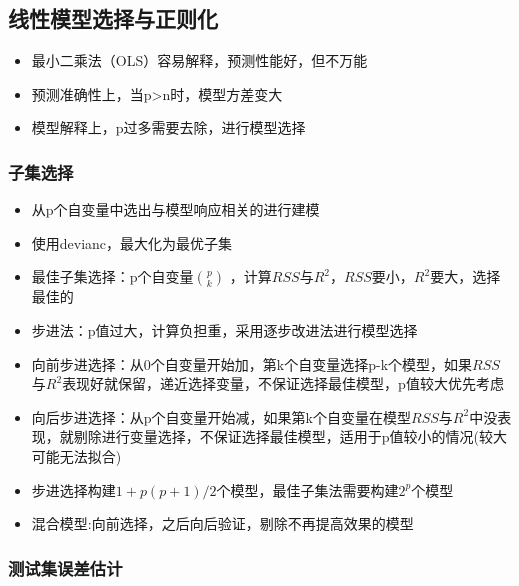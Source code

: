 \documentclass[
]{book}
\providecommand{\tightlist}{%
  \setlength{\itemsep}{0pt}\setlength{\parskip}{0pt}}
\begin{document}
\hypertarget{ux7ebfux6027ux6a21ux578bux9009ux62e9ux4e0eux6b63ux5219ux5316}{%
\subsection{线性模型选择与正则化}\label{ux7ebfux6027ux6a21ux578bux9009ux62e9ux4e0eux6b63ux5219ux5316}}

\begin{itemize}
\tightlist
\item
  最小二乘法（OLS）容易解释，预测性能好，但不万能
\item
  预测准确性上，当p\textgreater n时，模型方差变大
\item
  模型解释上，p过多需要去除，进行模型选择
\end{itemize}

\hypertarget{ux5b50ux96c6ux9009ux62e9}{%
\subsubsection{子集选择}\label{ux5b50ux96c6ux9009ux62e9}}

\begin{itemize}
\tightlist
\item
  从p个自变量中选出与模型响应相关的进行建模
\item
  使用devianc，最大化为最优子集
\item
  最佳子集选择：p个自变量\(p \choose k\) ，计算\(RSS\)与\(R^2\)，\(RSS\)要小，\(R^2\)要大，选择最佳的
\item
  步进法：p值过大，计算负担重，采用逐步改进法进行模型选择
\item
  向前步进选择：从0个自变量开始加，第k个自变量选择p-k个模型，如果\(RSS\)与\(R^2\)表现好就保留，递近选择变量，不保证选择最佳模型，p值较大优先考虑
\item
  向后步进选择：从p个自变量开始减，如果第k个自变量在模型\(RSS\)与\(R^2\)中没表现，就剔除进行变量选择，不保证选择最佳模型，适用于p值较小的情况(较大可能无法拟合)
\item
  步进选择构建\(1 + p(p+1)/2\)个模型，最佳子集法需要构建\(2^p\)个模型
\item
  混合模型:向前选择，之后向后验证，剔除不再提高效果的模型
\end{itemize}

\hypertarget{ux6d4bux8bd5ux96c6ux8befux5deeux4f30ux8ba1}{%
\subsubsection{测试集误差估计}\label{ux6d4bux8bd5ux96c6ux8befux5deeux4f30ux8ba1}}
\end{document}
